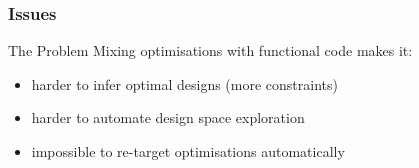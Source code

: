 \begin{frame}[fragile]
  \frametitle{Issues}

  \begin{beamerboxesrounded}{The Problem}
    Mixing optimisations with functional code makes it:
    \begin{itemize}
    \item harder to infer optimal designs (more constraints)
    \item harder to automate design space exploration
    \item impossible to re-target optimisations automatically
    \end{itemize}
  \end{beamerboxesrounded}
\end{frame}


